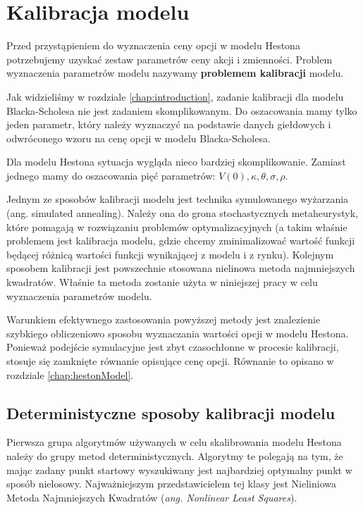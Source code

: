 \documentclass{pracamgr}
\begin{document}
\chapter{Kalibracja modelu}
\label{chap:chapterModelCalibration}



Przed przystąpieniem do wyznaczenia ceny opcji w modelu Hestona potrzebujemy uzyskać zestaw 
parametrów ceny akcji i zmienności. Problem wyznaczenia parametrów modelu 
nazywamy \textbf{problemem kalibracji} modelu.  

Jak widzieliśmy w rozdziale \ref{chap:introduction}, zadanie kalibracji dla modelu Blacka-Scholesa 
nie jest zadaniem skomplikowanym. Do oszacowania mamy tylko jeden parametr, który należy wyznaczyć na 
podstawie danych giełdowych i odwróconego wzoru na cenę opcji w modelu Blacka-Scholesa.

Dla modelu Hestona sytuacja wygląda nieco bardziej skomplikowanie. Zamiast jednego mamy do 
oszacowania pięć parametrów:
$V(0),\kappa, \theta, \sigma, \rho$.  

Jednym ze sposobów kalibracji modelu jest technika symulowanego 
wyżarzania (ang. simulated annealing). Należy ona do 
grona stochastycznych metaheurystyk,  które pomagają w rozwiązaniu problemów 
optymalizacyjnych (a takim właśnie problemem 
jest kalibracja modelu, gdzie chcemy zminimalizować wartość funkcji będącej różnicą wartości funkcji 
wynikającej z modelu i z rynku). Kolejnym sposobem kalibracji jest powszechnie stosowana nielinowa
metoda najmniejszych kwadratów. 
Właśnie ta metoda zostanie użyta w niniejszej pracy w celu wyznaczenia parametrów modelu.

Warunkiem efektywnego zastosowania powyższej metody jest znalezienie szybkiego obliczeniowo sposobu 
wyznaczania wartości opcji w 
modelu Hestona. Ponieważ podejście symulacyjne jest zbyt czasochłonne w procesie kalibracji, stosuje 
się zamknięte równanie opisujące cenę opcji. Równanie to opisano w rozdziale \ref{chap:hestonModel}.


\section{Deterministyczne sposoby kalibracji modelu} 
Pierwsza grupa algorytmów używanych w celu skalibrowania modelu Hestona należy do grupy metod 
deterministycznych.
Algorytmy te polegają na tym, że mając zadany punkt startowy wyszukiwany jest najbardziej optymalny
punkt w sposób nielosowy.
Najważniejszym przedstawicielem tej klasy jest Nieliniowa Metoda Najmniejszych Kwadratów 
(\textit{ang. Nonlinear Least Squares}).
\end{document}
